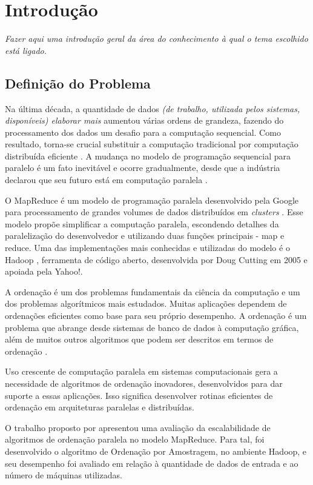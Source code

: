 \chapter{Introdução}
\label{cap:introducao}

\textit{Fazer aqui uma introdução geral da área do conhecimento à qual o tema escolhido está ligado.}

\section{Definição do Problema}

Na última década, a quantidade de dados\textit{ (de trabalho, utilizada pelos sistemas, disponíveis) elaborar mais} aumentou várias ordens de grandeza, fazendo do processamento dos dados um desafio para a computação sequencial. Como resultado, torna-se crucial substituir a computação tradicional por computação distribuída eficiente \cite{Lin:2010}. A mudança no modelo de programação sequencial para paralelo é um fato inevitável e ocorre gradualmente, desde que a indústria declarou que seu futuro está em computação paralela \cite{Asanovic:2009}. 

O MapReduce é um modelo de programação paralela desenvolvido pela Google para processamento de grandes volumes de dados distribuídos em \textit{clusters} \cite{Dean:2008}. Esse modelo propõe simplificar a computação paralela, escondendo detalhes da paralelização do desenvolvedor e utilizando duas funções principais - map e reduce.
Uma das implementações mais conhecidas e utilizadas do modelo é o Hadoop \cite{Hadoop:2010}, ferramenta de código aberto, desenvolvida por Doug Cutting em 2005 e apoiada pela Yahoo!. 

A ordenação é um dos problemas fundamentais da ciência da computação e um dos problemas algorítmicos mais estudados. Muitas aplicações dependem de ordenações eficientes como base para seu próprio desempenho. A ordenação é um problema que abrange desde sistemas de banco de dados à computação gráfica, além de muitos outros algoritmos que podem ser descritos em termos de ordenação  \cite{Satish:2009,Amato:1996}.  

Uso crescente de computação paralela em sistemas computacionais gera a necessidade de algoritmos de ordenação inovadores, desenvolvidos para dar suporte a essas aplicações. Isso significa desenvolver rotinas eficientes de ordenação em arquiteturas paralelas e distribuídas. 

O trabalho proposto por  
apresentou uma avaliação da escalabilidade de algoritmos de ordenação paralela no modelo MapReduce. Para tal, foi desenvolvido o algoritmo de Ordenação por Amostragem, no ambiente Hadoop, e seu desempenho foi avaliado em relação à quantidade de dados de entrada e ao número de máquinas utilizadas. 

